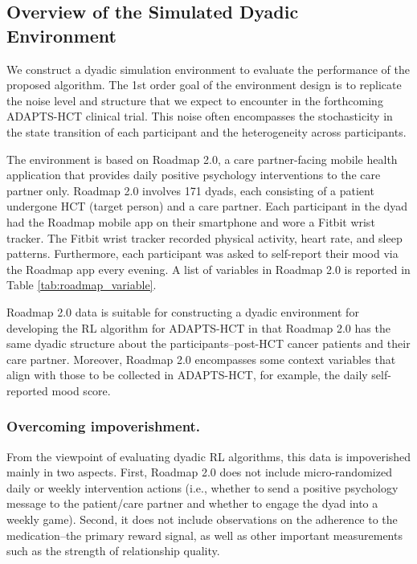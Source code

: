 \subsection{Overview of the Simulated Dyadic Environment}


We construct a dyadic simulation environment to evaluate the performance of the proposed algorithm. The 1st order goal of the environment design is to replicate the noise level and structure that we expect to encounter in the forthcoming ADAPTS-HCT clinical trial. This noise often encompasses the stochasticity in the state transition of each participant and the heterogeneity across participants.

The environment is based on Roadmap 2.0, a care partner-facing mobile health application that provides daily positive psychology interventions to the care partner only. Roadmap 2.0 involves 171 dyads, each consisting of a patient undergone HCT (target person) and a care partner. Each participant in the dyad had the Roadmap mobile app on their smartphone and wore a Fitbit wrist tracker. The Fitbit wrist tracker recorded physical activity, heart rate, and sleep patterns. Furthermore, each participant was asked to self-report their mood via the Roadmap app every evening. A list of variables in Roadmap 2.0 is reported in Table \ref{tab:roadmap_variable}.

Roadmap 2.0 data is suitable for constructing a dyadic environment for developing the RL algorithm for ADAPTS-HCT in that Roadmap 2.0 has the same dyadic structure about the participants--post-HCT cancer patients and their care partner. Moreover, Roadmap 2.0 encompasses some context variables that align with those to be collected in ADAPTS-HCT, for example, the daily self-reported mood score.

\subsubsection{Overcoming impoverishment.} From the viewpoint of evaluating dyadic RL algorithms, this data is impoverished \cite{trella2022designing} mainly in two aspects. First, Roadmap 2.0 does not include micro-randomized daily or weekly intervention actions (i.e., whether to send a positive psychology message to the patient/care partner and whether to engage the dyad into a weekly game). Second, it does not include observations on the adherence to the medication--the primary reward signal, as well as other important measurements such as the strength of relationship quality. 

